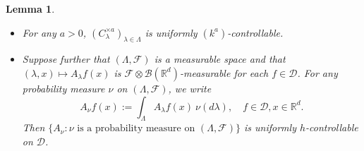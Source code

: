 \documentclass[12pt,a4paper]{amsart}
\theoremstyle{plain}
\newtheorem{lem}[thm]{Lemma}
\theoremstyle{definition}
\numberwithin{equation}{section}
\begin{document}
\begin{lem}
\begin{itemize}
\item[(3)] For any $a>0$, $(C^{\times a}_\lambda)_{\lambda \in \Lambda}$ is uniformly $(k^a)$-controllable.
\item[(4)]
  Suppose further that $(\Lambda, \mathscr F)$ is a measurable space and that $(\lambda,x)\mapsto A_\lambda f(x)$ is $\mathscr F \otimes \mathscr B(\mathbb R^d)$-measurable for each $f\in \mathcal D$.
    For any probability measure $\nu$ on $(\Lambda, \mathscr F)$,  we write
\[
    A_\nu f(x)
    := \int_{\Lambda} A_\lambda f (x)~\nu(d\lambda),
    \quad f\in \mathcal D, x\in \mathbb R^d.
\]
    Then  $\{A_\nu: \nu \text{ is  a probability measure on } (\Lambda, \mathscr F)\}$ is uniformly $h$-controllable on $\mathcal D$.
\end{itemize}
\end{lem}
\end{document}
